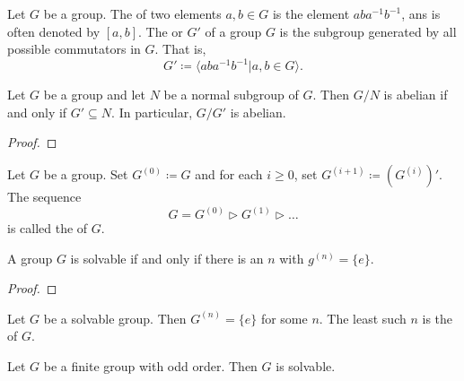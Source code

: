 \begin{definition}
  Let \(G\) be a group. The  of two elements \(a, b \in G\) is the element \(aba^{-1}b^{-1}\), ans is often denoted by \([a,b]\). The  or  \(G'\) of a group \(G\) is the subgroup generated by all possible commutators in \(G\). That is,
  \[G' \coloneqq \langle aba^{-1}b^{-1} | a, b \in G \rangle.\]
\end{definition}

\begin{theorem}
  Let \(G\) be a group and let \(N\) be a normal subgroup of \(G\). Then \(G / N\) is abelian if and only if \(G' \subseteq N\). In particular, \(G/G'\) is abelian.
\end{theorem}

\begin{proof}
\end{proof}

\begin{definition}
  Let \(G\) be a group. Set \(G^{(0)} \coloneqq G\) and for each \(i \geq 0\), set \(G^{(i+1)} \coloneqq (G^{(i)})'\). The sequence
  \[G = G^{(0)}\triangleright G^{(1)} \triangleright \ldots \]
  is called the  of \(G\).
\end{definition}

\begin{theorem}
  A group \(G\) is solvable if and only if there is an \(n\) with \(g^{(n)} = \{e\}\).
\end{theorem}

\begin{proof}
\end{proof}

\begin{definition}
  Let \(G\) be a solvable group. Then \(G^{(n)} = \{e\}\) for some \(n\). The least such \(n\) is the  of \(G\).
\end{definition}

\begin{theorem}
  Let \(G\) be a finite group with odd order. Then \(G\) is solvable.
\end{theorem}



